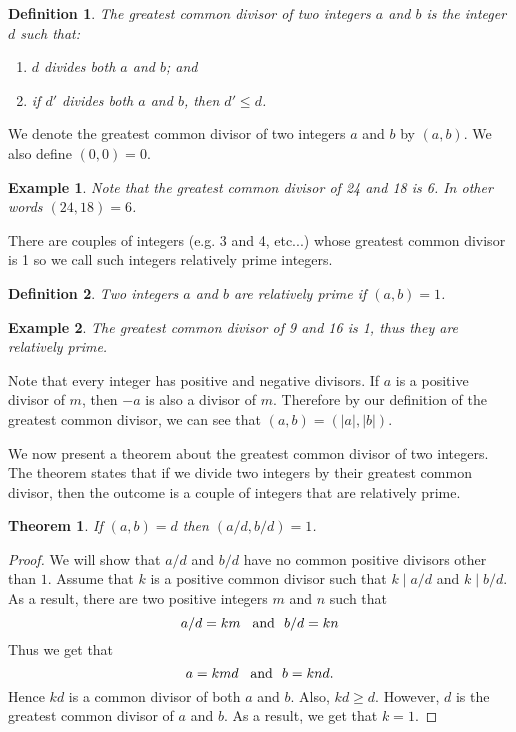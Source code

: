 \documentclass[12pt,letterpaper]{book}
\newtheorem{definition}{Definition}
\newtheorem{theorem}{Theorem}
\newtheorem{example}{Example}
\begin{document}
\begin{definition}
The greatest common divisor of two integers $a$ and $b$ is the integer $d$ such that:
\begin{enumerate}
\item $d$ divides both $a$ and $b$; and
\item if $d'$ divides both $a$ and $b$, then $d'\leq d$.
\end{enumerate}
\end{definition}

We denote the greatest common divisor of two integers $a$ and $b$ by
$(a,b)$.  We also define $(0,0)=0$.

\begin{example}
Note that the greatest common divisor of 24 and 18 is 6.  In other
words $(24,18)=6$.
\end{example}

There are couples of integers (e.g. 3 and 4, etc...) whose greatest
common divisor is 1 so we call such integers relatively prime
integers.

\begin{definition}
Two integers $a$ and $b$ are relatively prime if $(a,b)=1$.
\end{definition}

\begin{example}
The greatest common divisor of 9 and 16 is 1, thus they are
relatively prime.
\end{example}

Note that every integer has positive and negative divisors.  If
$a$ is a positive divisor of $m$, then $-a$ is also a divisor of
$m$.  Therefore by our definition of the greatest common divisor, we
can see that $(a,b)=(|a|,|b|)$.

\par We now present a theorem about the greatest common divisor of
two integers.  The theorem states that if we divide two integers by
their greatest common divisor, then the outcome is a couple of integers that are relatively prime.

\begin{theorem}
If $(a,b)=d$ then $(a/d,b/d)=1$.
\end{theorem}

\begin{proof}
We will show that $a/d$ and $b/d$ have no common positive divisors
other than $1$.  Assume that $k$ is a positive common divisor such
that $k\mid a/d$ and $k\mid b/d$.  As a result, there are two
positive integers $m$ and $n$ such that
\begin{equation*}
a/d=km \hspace{0.3 cm}\mbox{and} \ \  b/d=kn
\end{equation*}
Thus we get that
\begin{equation*}
a=kmd \hspace{0.3 cm}\mbox{and} \ \  b=knd.
\end{equation*}
Hence $kd$ is a common divisor of both $a$ and $b$.  Also,
$kd\geq d$. However, $d$ is the greatest common divisor of $a$ and
$b$.  As a result, we get that $k=1$.
\end{proof}
\end{document}
